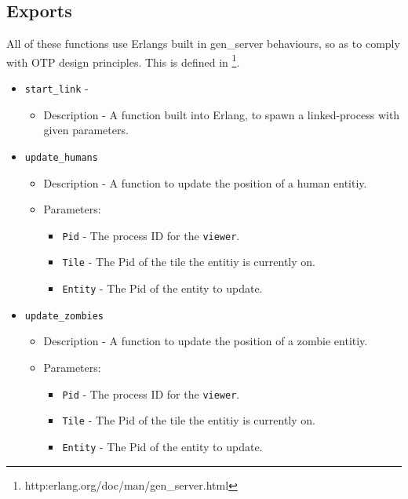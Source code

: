 \subsection{Exports}
All of these functions use Erlangs built in gen\_server behaviours, so as to comply with OTP design principles. This is defined in \footnote{http:erlang.org/doc/man/gen\_server.html}.
\begin{itemize}
	\item {\tt start\_link} - 
		\begin{itemize}
			\item Description - A function built into Erlang, to spawn a linked-process with given parameters.
		\end{itemize}

	\item {\tt update\_humans}
		\begin{itemize}
			\item Description - A function to update the position of a human entitiy.
			\item Parameters:
				\begin{itemize}
					\item {\tt Pid} - The process ID for the \verb+viewer+.
					\item {\tt Tile} - The Pid of the tile the entitiy is currently on.
					\item {\tt Entity} - The Pid of the entity to update.
				\end{itemize}
		\end{itemize}

	\item {\tt update\_zombies}
		\begin{itemize}
			\item Description - A function to update the position of a zombie entitiy.
			\item Parameters:
				\begin{itemize}
					\item {\tt Pid} - The process ID for the \verb+viewer+.
					\item {\tt Tile} - The Pid of the tile the entitiy is currently on.
					\item {\tt Entity} - The Pid of the entity to update.
				\end{itemize}
		\end{itemize}


\end{itemize}
